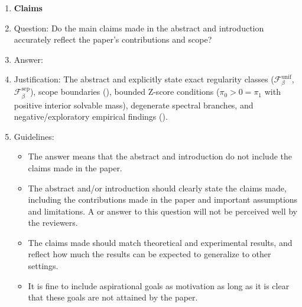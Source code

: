 \documentclass{article}
\theoremstyle{plain}
\theoremstyle{definition}
\theoremstyle{remark}
\begin{document}
\begin{enumerate}

\item {\bf Claims}
    \item[] Question: Do the main claims made in the abstract and introduction accurately reflect the paper's contributions and scope?
    \item[] Answer: \answerYes{}
    \item[] Justification: The abstract and  explicitly state exact regularity classes ($\mathcal{F}_\beta^{\mathrm{unif}}$, $\mathcal{F}_\beta^{\mathrm{sep}}$), scope boundaries (), bounded Z-score conditions ($\pi_0 > 0 = \pi_1$ with positive interior solvable mass), degenerate spectral branches, and negative/exploratory empirical findings ().
    \item[] Guidelines:
    \begin{itemize}
        \item The answer \answerNA{} means that the abstract and introduction do not include the claims made in the paper.
        \item The abstract and/or introduction should clearly state the claims made, including the contributions made in the paper and important assumptions and limitations. A \answerNo{} or \answerNA{} answer to this question will not be perceived well by the reviewers.
        \item The claims made should match theoretical and experimental results, and reflect how much the results can be expected to generalize to other settings.
        \item It is fine to include aspirational goals as motivation as long as it is clear that these goals are not attained by the paper.
    \end{itemize}


\end{enumerate}
\end{document}
